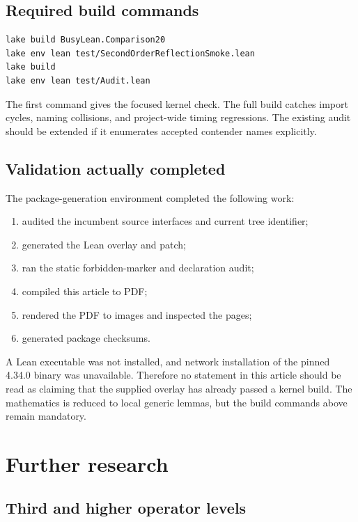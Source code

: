 \documentclass[11pt]{article}
\theoremstyle{definition}
\theoremstyle{remark}
\begin{document}
\subsection{Required build commands}

\begin{lstlisting}[language={}]
lake build BusyLean.Comparison20
lake env lean test/SecondOrderReflectionSmoke.lean
lake build
lake env lean test/Audit.lean
\end{lstlisting}

The first command gives the focused kernel check. The full build catches import
cycles, naming collisions, and project-wide timing regressions. The existing
audit should be extended if it enumerates accepted contender names explicitly.

\subsection{Validation actually completed}

The package-generation environment completed the following work:

\begin{enumerate}[leftmargin=*]
\item audited the incumbent source interfaces and current tree identifier;
\item generated the Lean overlay and patch;
\item ran the static forbidden-marker and declaration audit;
\item compiled this article to PDF;
\item rendered the PDF to images and inspected the pages;
\item generated package checksums.
\end{enumerate}

A Lean executable was not installed, and network installation of the pinned
4.34.0 binary was unavailable. Therefore no statement in this article should be
read as claiming that the supplied overlay has already passed a kernel build.
The mathematics is reduced to local generic lemmas, but the build commands above
remain mandatory.

\section{Further research}

\subsection{Third and higher operator levels}
\end{document}
